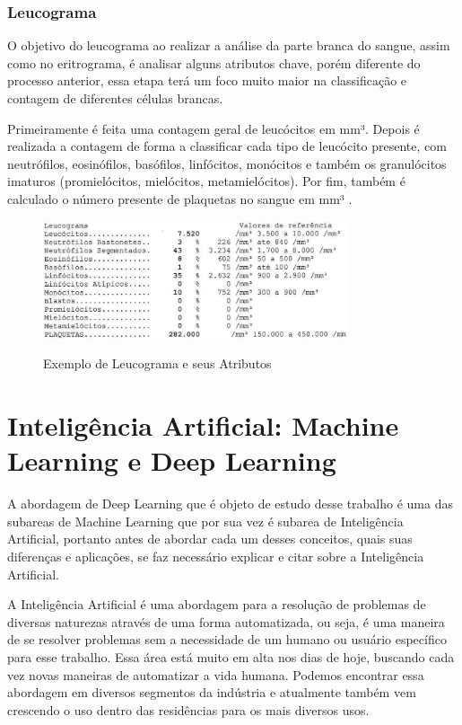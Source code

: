 \subsubsection{Leucograma}
O objetivo do leucograma ao realizar a análise da parte branca do sangue, assim como no eritrograma, é analisar alguns atributos chave, porém diferente do processo anterior, essa etapa terá um foco muito maior na classificação e contagem de diferentes células brancas.

Primeiramente é feita uma contagem geral de leucócitos em mm³. Depois é realizada a contagem de forma a classificar cada tipo de leucócito presente, com neutrófilos, eosinófilos, basófilos, linfócitos, monócitos e também os granulócitos imaturos (promielócitos, mielócitos, metamielócitos). Por fim, também é calculado o número presente de plaquetas no sangue em mm³ \cite{interpretacaoHemograma, manualHematologia}.

\begin{figure}[!htb]
    \centering
    \caption{Exemplo de Leucograma e seus Atributos}
    \includegraphics[width=0.80\textwidth]{img/leucograma.jpg}
    \label{fig:leucograma}
 \end{figure}

\section{Inteligência Artificial: Machine Learning e Deep Learning}
\label{sec:conceito2}
A abordagem de Deep Learning que é objeto de estudo desse trabalho é uma das subareas de Machine Learning que por sua vez é subarea de Inteligência Artificial, portanto antes de abordar cada um desses conceitos, quais suas diferenças e aplicações, se faz necessário explicar e citar sobre a Inteligência Artificial.

A Inteligência Artificial é uma abordagem para a resolução de problemas de diversas naturezas através de uma forma automatizada, ou seja, é uma maneira de se resolver problemas sem a necessidade de um humano ou usuário específico para esse trabalho. Essa área está muito em alta nos dias de hoje, buscando cada vez novas maneiras de automatizar a vida humana. Podemos encontrar essa abordagem em diversos segmentos da indústria e atualmente também vem crescendo o uso dentro das residências para os mais diversos usos.

